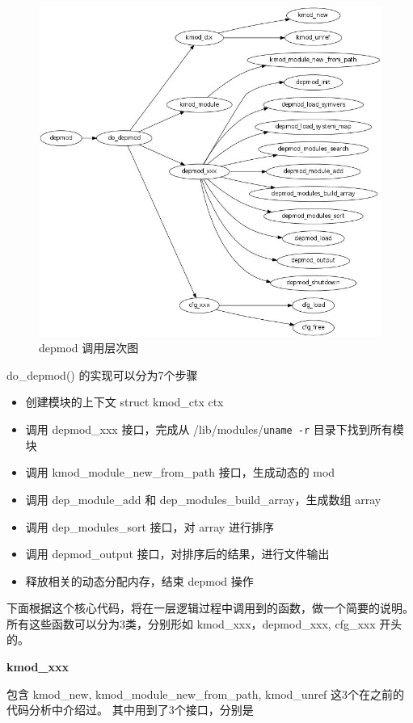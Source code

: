\documentclass[11pt,a4paper]{article}
\makeatletter
\def\maxwidth{\ifdim\Gin@nat@width>\linewidth\linewidth
\else\Gin@nat@width\fi}
\let\Oldincludegraphics\includegraphics
\renewcommand{\includegraphics}[1]{\Oldincludegraphics[width=\maxwidth]{#1}}
\makeatother
\begin{document}
\begin{figure}[htbp]
\centering
\includegraphics{./figures/depmod.jpg}
\caption{depmod 调用层次图}
\end{figure}

do\_depmod() 的实现可以分为7个步骤

\begin{itemize}
\item
  创建模块的上下文 struct kmod\_ctx ctx
\item
  调用 depmod\_xxx 接口，完成从 /lib/modules/\texttt{uname -r}
  目录下找到所有模块
\item
  调用 kmod\_module\_new\_from\_path 接口，生成动态的 mod
\item
  调用 dep\_module\_add 和 dep\_modules\_build\_array，生成数组 array
\item
  调用 dep\_modules\_sort 接口，对 array 进行排序
\item
  调用 depmod\_output 接口，对排序后的结果，进行文件输出
\item
  释放相关的动态分配内存，结束 depmod 操作
\end{itemize}
下面根据这个核心代码，将在一层逻辑过程中调用到的函数，做一个简要的说明。
所有这些函数可以分为3类，分别形如 kmod\_xxx，depmod\_xxx, cfg\_xxx
开头的。

\textbf{kmod\_xxx}

包含 kmod\_new, kmod\_module\_new\_from\_path, kmod\_unref
这3个在之前的代码分析中介绍过。 其中用到了3个接口，分别是
\end{document}
